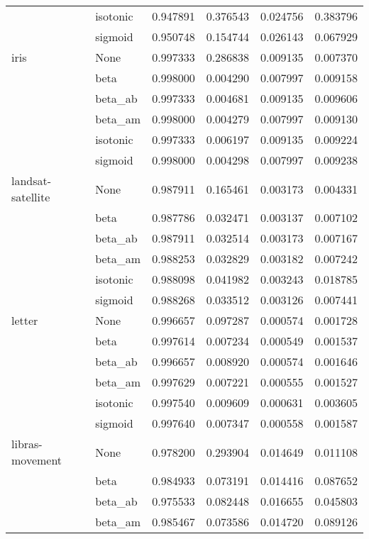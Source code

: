 \begin{tabular}{llrrrr}
        & isotonic &  0.947891 &  0.376543 &  0.024756 &  0.383796 \\
        & sigmoid &  0.950748 &  0.154744 &  0.026143 &  0.067929 \\
iris & None &  0.997333 &  0.286838 &  0.009135 &  0.007370 \\
        & beta &  0.998000 &  0.004290 &  0.007997 &  0.009158 \\
        & beta\_ab &  0.997333 &  0.004681 &  0.009135 &  0.009606 \\
        & beta\_am &  0.998000 &  0.004279 &  0.007997 &  0.009130 \\
        & isotonic &  0.997333 &  0.006197 &  0.009135 &  0.009224 \\
        & sigmoid &  0.998000 &  0.004298 &  0.007997 &  0.009238 \\
landsat-satellite & None &  0.987911 &  0.165461 &  0.003173 &  0.004331 \\
        & beta &  0.987786 &  0.032471 &  0.003137 &  0.007102 \\
        & beta\_ab &  0.987911 &  0.032514 &  0.003173 &  0.007167 \\
        & beta\_am &  0.988253 &  0.032829 &  0.003182 &  0.007242 \\
        & isotonic &  0.988098 &  0.041982 &  0.003243 &  0.018785 \\
        & sigmoid &  0.988268 &  0.033512 &  0.003126 &  0.007441 \\
letter & None &  0.996657 &  0.097287 &  0.000574 &  0.001728 \\
        & beta &  0.997614 &  0.007234 &  0.000549 &  0.001537 \\
        & beta\_ab &  0.996657 &  0.008920 &  0.000574 &  0.001646 \\
        & beta\_am &  0.997629 &  0.007221 &  0.000555 &  0.001527 \\
        & isotonic &  0.997540 &  0.009609 &  0.000631 &  0.003605 \\
        & sigmoid &  0.997640 &  0.007347 &  0.000558 &  0.001587 \\
libras-movement & None &  0.978200 &  0.293904 &  0.014649 &  0.011108 \\
        & beta &  0.984933 &  0.073191 &  0.014416 &  0.087652 \\
        & beta\_ab &  0.975533 &  0.082448 &  0.016655 &  0.045803 \\
        & beta\_am &  0.985467 &  0.073586 &  0.014720 &  0.089126 \\

\end{tabular}
